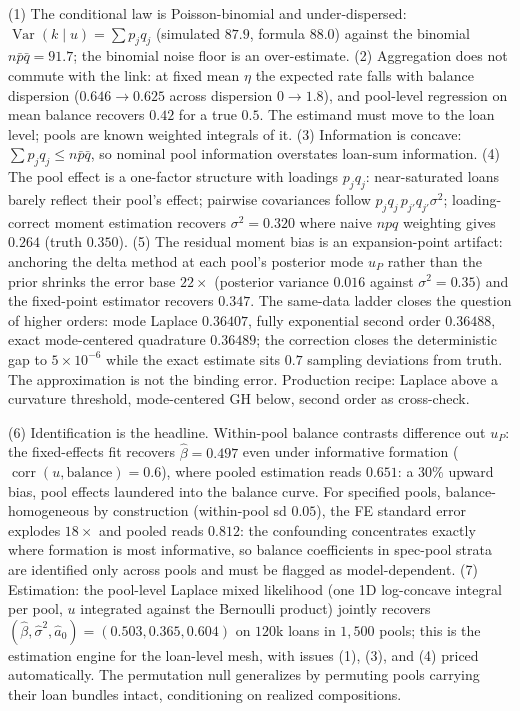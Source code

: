 \documentclass[11pt]{article}
\begin{document}
(1) The conditional law is Poisson-binomial and under-dispersed:
$\operatorname{Var}(k\mid u)=\sum p_jq_j$ (simulated $87.9$, formula
$88.0$) against the binomial $n\bar p\bar q = 91.7$; the binomial noise
floor is an over-estimate. (2) Aggregation does not commute with the
link: at fixed mean $\eta$ the expected rate falls with balance
dispersion ($0.646\to0.625$ across dispersion $0\to1.8$), and pool-level
regression on mean balance recovers $0.42$ for a true $0.5$. The
estimand must move to the loan level; pools are known weighted integrals
of it. (3) Information is concave: $\sum p_jq_j \le n\bar p\bar q$, so
nominal pool information overstates loan-sum information. (4) The pool
effect is a one-factor structure with loadings $p_jq_j$: near-saturated
loans barely reflect their pool's effect; pairwise covariances follow
$p_jq_j\,p_{j'}q_{j'}\sigma^2$; loading-correct moment estimation
recovers $\sigma^2 = 0.320$ where naive $npq$ weighting gives $0.264$
(truth $0.350$). (5) The residual moment bias is an expansion-point
artifact: anchoring the delta method at each pool's posterior mode
$\hat u_P$ rather than the prior shrinks the error base $22\times$
(posterior variance $0.016$ against $\sigma^2=0.35$) and the
fixed-point estimator recovers $0.347$. The same-data ladder closes the
question of higher orders: mode Laplace $0.36407$, fully exponential
second order $0.36488$, exact mode-centered quadrature $0.36489$; the
correction closes the deterministic gap to $5\times10^{-6}$ while the
exact estimate sits $0.7$ sampling deviations from truth. The
approximation is not the binding error. Production recipe: Laplace above
a curvature threshold, mode-centered GH below, second order as
cross-check.

(6) Identification is the headline. Within-pool balance contrasts
difference out $u_P$: the fixed-effects fit recovers
$\hat\beta = 0.497$ even under informative formation
($\operatorname{corr}(u,\text{balance})=0.6$), where pooled estimation
reads $0.651$: a $30\%$ upward bias, pool effects laundered into the
balance curve. For specified pools, balance-homogeneous by construction
(within-pool sd $0.05$), the FE standard error explodes $18\times$ and
pooled reads $0.812$: the confounding concentrates exactly where
formation is most informative, so balance coefficients in spec-pool
strata are identified only across pools and must be flagged as
model-dependent. (7) Estimation: the pool-level Laplace mixed likelihood
(one 1D log-concave integral per pool, $u$ integrated against the
Bernoulli product) jointly recovers $(\hat\beta, \hat\sigma^2, \hat a_0)
= (0.503, 0.365, 0.604)$ on $120$k loans in $1{,}500$ pools; this is the
estimation engine for the loan-level mesh, with issues (1), (3), and (4)
priced automatically. The permutation null generalizes by permuting
pools carrying their loan bundles intact, conditioning on realized
compositions.
\end{document}
